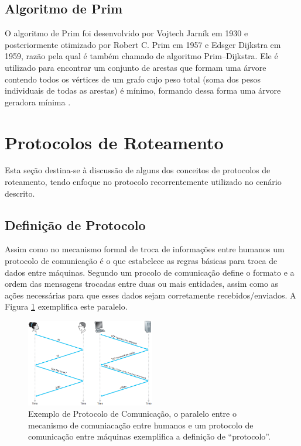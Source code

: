 \subsection{Algoritmo de Prim} 
\label{subsection-algoritmo-prim}
O algoritmo de Prim foi desenvolvido por  Vojtech Jarník em 1930 e posteriormente otimizado por Robert C. Prim em 1957 e Edsger Dijkstra em 1959, razão pela qual é também chamado de algoritmo Prim–Dijkstra. Ele é utilizado para encontrar um conjunto de arestas que formam uma árvore contendo todos os vértices de um grafo cujo peso total (soma dos pesos individuais de todas as arestas) é mínimo, formando dessa forma uma árvore geradora mínima \cite{Prim1957}.


\section{Protocolos de Roteamento}
\label{cap_protocolos_de_roteamento}
Esta seção destina-se à discussão de alguns dos conceitos de protocolos de roteamento, tendo enfoque no protocolo recorrentemente utilizado no cenário descrito.

\subsection{Definição de Protocolo}
Assim como no mecanismo formal de troca de informações entre humanos um protocolo de comunicação é o que estabelece as regras básicas para troca de dados entre máquinas. Segundo \cite{Book-Kurose2013} um procolo de comunicação define o formato e a ordem das mensagens trocadas entre duas ou mais entidades, assim como as ações necessárias para que esses dados sejam corretamente recebidos/enviados. A Figura \ref{fig_explicacao_protocolo} exemplifica este paralelo.

\begin{figure}[!htb]
	\centering
	\includegraphics[width=0.5\textwidth]{./figuras/Explicacao-Protocolo.png} %
	\caption[Exemplo de Protocolo de Comunicação]{Exemplo de Protocolo de Comunicação, o paralelo entre o mecanismo de comuniacação entre humanos e um protocolo de comunicação entre máquinas exemplifica a definição de ``protocolo''.}
	\label{fig_explicacao_protocolo}
\end{figure}

